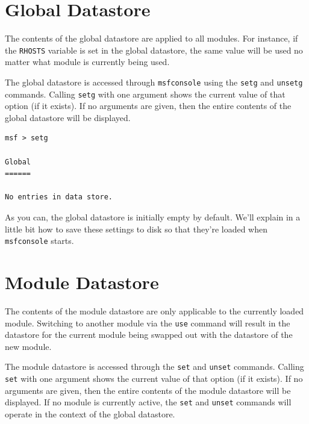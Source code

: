 \documentclass{report}
\begin{document}
    \section{Global Datastore}
    \label{ENV-GLOBAL}

\par
The contents of the global datastore are applied to all modules. For instance,
if the \texttt{RHOSTS} variable is set in the global datastore, the same value
will be used no matter what module is currently being used.

\par
The global datastore is accessed through \texttt{msfconsole} using the
\texttt{setg} and \texttt{unsetg} commands. Calling \texttt{setg} with one
argument shows the current value of that option (if it exists). If no arguments
are given, then the entire contents of the global datastore will be displayed.

\begin{verbatim}
msf > setg

Global
======

No entries in data store.

\end{verbatim}

\par
As you can, the global datastore is initially empty by default. We'll explain
in a little bit how to save these settings to disk so that they're loaded when
\texttt{msfconsole} starts.

    \section{Module Datastore}
    \label{ENV-TEMP}

\par
The contents of the module datastore are only applicable to the currently loaded
module. Switching to another module via the \texttt{use} command will result in
the datastore for the current module being swapped out with the datastore of the
new module.

\par
The module datastore is accessed through the \texttt{set} and \texttt{unset}
commands. Calling \texttt{set} with one argument shows the current value of that
option (if it exists). If no arguments are given, then the entire contents of
the module datastore will be displayed. If no module is currently active, the
\texttt{set} and \texttt{unset} commands will operate in the context of the
global datastore.
\end{document}
